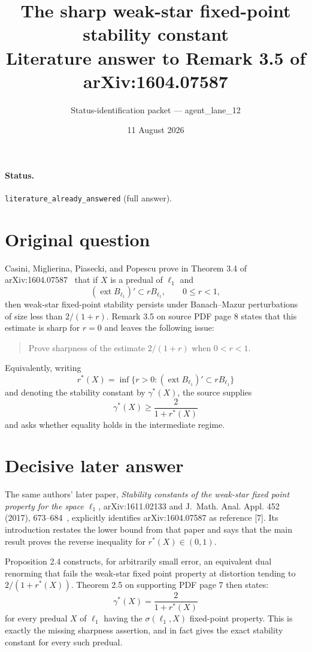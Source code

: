 \documentclass[11pt]{article}
\title{The sharp weak-star fixed-point stability constant\\
\large Literature answer to Remark 3.5 of arXiv:1604.07587}
\author{Status-identification packet --- agent\_lane\_12}
\date{11 August 2026}
\begin{document}
\maketitle

\paragraph{Status.}
\texttt{literature\_already\_answered} (full answer).

\section*{Original question}

Casini, Miglierina, Piasecki, and Popescu prove in Theorem 3.4 of
arXiv:1604.07587~\cite{source} that if $X$ is a predual of $\ell_1$ and
\[
 (\operatorname{ext}B_{\ell_1})'\subset rB_{\ell_1},\qquad 0\leq r<1,
\]
then weak-star fixed-point stability persists under Banach--Mazur
perturbations of size less than $2/(1+r)$.  Remark 3.5 on source PDF page 8
states that this estimate is sharp for $r=0$ and leaves the following issue:

\begin{quote}
Prove sharpness of the estimate $2/(1+r)$ when $0<r<1$.
\end{quote}

Equivalently, writing
\[
 r^*(X)=\inf\{r>0:(\operatorname{ext}B_{\ell_1})'
                    \subset rB_{\ell_1}\}
\]
and denoting the stability constant by $\gamma^*(X)$, the source supplies
\[
 \gamma^*(X)\geq\frac{2}{1+r^*(X)}
\]
and asks whether equality holds in the intermediate regime.

\section*{Decisive later answer}

The same authors' later paper, \emph{Stability constants of the weak-star
fixed point property for the space $\ell_1$}, arXiv:1611.02133 and J.~Math.
Anal. Appl. 452 (2017), 673--684~\cite{answer}, explicitly identifies
arXiv:1604.07587 as reference [7].  Its introduction restates the lower bound
from that paper and says that the main result proves the reverse inequality
for $r^*(X)\in(0,1)$.

Proposition 2.4 constructs, for arbitrarily small error, an equivalent dual
renorming that fails the weak-star fixed point property at distortion tending
to $2/(1+r^*(X))$.  Theorem 2.5 on supporting PDF page 7 then states:
\[
 \boxed{\displaystyle
 \gamma^*(X)=\frac{2}{1+r^*(X)}}
\]
for every predual $X$ of $\ell_1$ having the $\sigma(\ell_1,X)$ fixed-point
property.  This is exactly the missing sharpness assertion, and in fact gives
the exact stability constant for every such predual.
\end{document}
